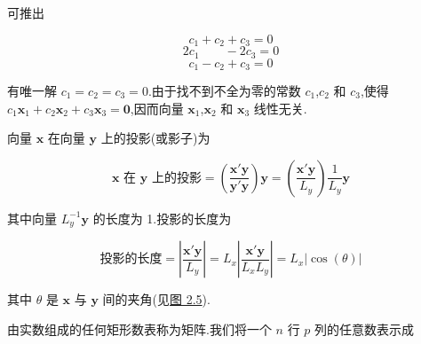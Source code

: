 可推出

\[
c_1 + c_2 + c_3 = 0
\]
\[
2c_1 \qquad - 2c_3 = 0
\]
\[
c_1 - c_2 + c_3 = 0
\]

有唯一解 $c_1 = c_2 = c_3 = 0$.由于找不到不全为零的常数 $c_1$,$c_2$ 和 $c_3$,使得 $c_1\bm{x}_1 + c_2\bm{x}_2 + c_3\bm{x}_3 = \bm{0}$,因而向量 $\bm{x}_1$,$\bm{x}_2$ 和 $\bm{x}_3$ 线性无关.

向量 $\bm{x}$ 在向量 $\bm{y}$ 上的投影(或影子)为

\label{eq:2-8}
\begin{equation}
\bm{x} \text{ 在 } \bm{y} \text{ 上的投影} = \left(\frac{\bm{x}'\bm{y}}{\bm{y}'\bm{y}}\right)\bm{y} = \left(\frac{\bm{x}'\bm{y}}{L_y}\right)\frac{1}{L_y}\bm{y} \tag{2-8}
\end{equation}

其中向量 $L_y^{-1}\bm{y}$ 的长度为 1.投影的长度为

\label{eq:2-9}
\begin{equation}
\text{投影的长度} = \left| \frac{\bm{x}'\bm{y}}{L_y} \right| = L_x\left| \frac{\bm{x}'\bm{y}}{L_xL_y} \right| = L_x| \cos(\theta) | \tag{2-9}
\end{equation}

其中 $\theta$ 是 $\bm{x}$ 与 $\bm{y}$ 间的夹角(见\hyperref[fig:2.5]{图 2.5}).

\begin{mvfigure}
\label{fig:2.5}
\end{mvfigure}


由实数组成的任何矩形数表称为矩阵.我们将一个 $n$ 行 $p$ 列的任意数表示成
